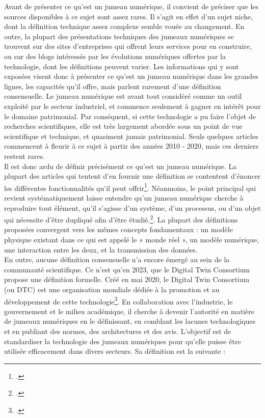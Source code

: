Avant de présenter ce qu'est un jumeau numérique, il convient de préciser que les sources disponibles à ce sujet sont assez rares. Il s'agit en effet d'un sujet niche, dont la définition technique assez complexe semble vouée au changement. En outre, la plupart des présentations techniques des jumeaux numériques se trouvent sur des sites d'entreprises qui offrent leurs services pour en construire, ou sur des blogs intéressés par les évolutions numériques offertes par la technologie, dont les définitions peuvent varier. Les informations qui y sont exposées visent donc à présenter ce qu'est un jumeau numérique dans les grandes lignes, les capacités qu'il offre, mais parlent rarement d'une définition consensuelle. Le jumeau numérique est avant tout considéré comme un outil exploité par le secteur industriel, et commence seulement à gagner en intérêt pour le domaine patrimonial. Par conséquent, si cette technologie a pu faire l'objet de recherches scientifiques, elle est très largement abordée sous un point de vue scientifique et technique, et quasiment jamais patrimonial. Seuls quelques articles commencent à fleurir à ce sujet à partir des années 2010 - 2020, mais ces derniers restent rares.\\

Il est donc ardu de définir précisément ce qu’est un jumeau numérique. La plupart des articles qui tentent d’en fournir une définition se contentent d’énoncer les différentes fonctionnalités qu’il peut offrir\footcite{MiroirMiroirJumeau2021}. Néanmoins, le point principal qui revient systématiquement laisse entendre qu’un jumeau numérique cherche à reproduire tout élément, qu’il s’agisse d’un système, d’un processus, ou d’un objet qui nécessite d’être dupliqué afin d’être étudié.\footcite{miskinisComparingInternetThings2018}. La plupart des définitions proposées convergent vers les mêmes concepts fondamentaux : un modèle physique existant dans ce qui est appelé le « monde réel », un modèle numérique, une interaction entre les deux, et la transmission des données.\\

En outre, aucune définition consensuelle n’a encore émergé au sein de la communauté scientifique. Ce n’est qu’en 2023, que le Digital Twin Consortium propose une définition formelle. Créé en mai 2020, le Digital Twin Consortium (ou DTC) est une organisation mondiale dédiée à la promotion et au développement de cette technologie\footcite{DigitalTwinConsortium}. En collaboration avec l'industrie, le gouvernement et le milieu académique, il cherche à devenir l'autorité en matière de jumeaux numériques en le définissant, en comblant les lacunes technologiques et en publiant des normes, des architectures et des avis. L'objectif est de standardiser la technologie des jumeaux numériques pour qu'elle puisse être utilisée efficacement dans divers secteurs.  Sa définition est la suivante :\\

